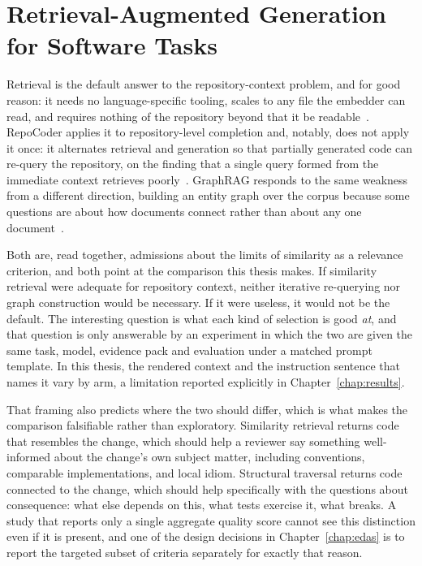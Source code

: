 \section{Retrieval-Augmented Generation for Software Tasks}
\label{sec:sota-rag}

Retrieval is the default answer to the repository-context problem, and for good
reason: it needs no language-specific tooling, scales to any file the embedder can
read, and requires nothing of the repository beyond that it be
readable~\cite{lewis2020rag,karpukhin2020dpr}. RepoCoder applies it to
repository-level completion and, notably, does not apply it once: it alternates
retrieval and generation so that partially generated code can re-query the
repository, on the finding that a single query formed from the immediate context
retrieves poorly~\cite{zhang2023repocoder}. GraphRAG responds to the same weakness
from a different direction, building an entity graph over the corpus because some
questions are about how documents connect rather than about any one
document~\cite{edge2024graphrag}.

Both are, read together, admissions about the limits of similarity as a relevance
criterion, and both point at the comparison this thesis makes. If similarity
retrieval were adequate for repository context, neither iterative re-querying nor
graph construction would be necessary. If it were useless, it would not be the
default. The interesting question is what each kind of selection is good \emph{at},
and that question is only answerable by an experiment in which the two are given
the same task, model, evidence pack and evaluation under a matched prompt template.
In this thesis, the rendered context and the instruction sentence that names it
vary by arm, a limitation reported explicitly in Chapter~\ref{chap:results}.

That framing also predicts where the two should differ, which is what makes the
comparison falsifiable rather than exploratory. Similarity retrieval returns code
that resembles the change, which should help a reviewer say something well-informed
about the change's own subject matter, including conventions, comparable
implementations, and local idiom. Structural traversal returns code connected to the change, which
should help specifically with the questions about consequence: what else depends on
this, what tests exercise it, what breaks. A study that reports only a single
aggregate quality score cannot see this distinction even if it is present, and one
of the design decisions in Chapter~\ref{chap:edas} is to report the targeted subset
of criteria separately for exactly that reason.

